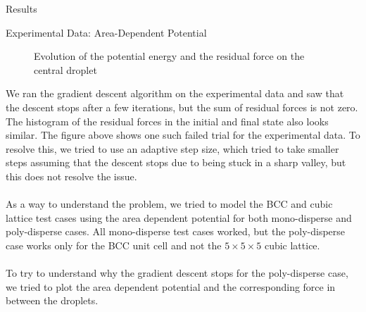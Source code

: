 \documentclass[12pt]{article}
\begin{document}
\begin{section}{Results}
\begin{subsection}{Experimental Data: Area-Dependent Potential}
\begin{figure}[h!]
    \caption{Evolution of the potential energy and the residual force on the central droplet}
\end{figure}
\par \noindent \newline We ran the gradient descent algorithm on the experimental data and saw that the descent stops after a few iterations, but the sum of residual forces is not zero. The histogram of the residual forces in the initial and final state also looks similar. The figure above shows one such failed trial for the experimental data. To resolve this, we tried to use an adaptive step size, which tried to take smaller steps assuming that the descent stops due to being stuck in a sharp valley, but this does not resolve the issue. \\\\
As a way to understand the problem, we tried to model the BCC and cubic lattice test cases using the area dependent potential for both mono-disperse and poly-disperse cases. All mono-disperse test cases worked, but the poly-disperse case works only for the BCC unit cell and not the $5\times5\times5$ cubic lattice. \\\\
To try to understand why the gradient descent stops for the poly-disperse case, we tried to plot the area dependent potential and the corresponding force in between the droplets.
\end{subsection}


\end{section}
\end{document}
